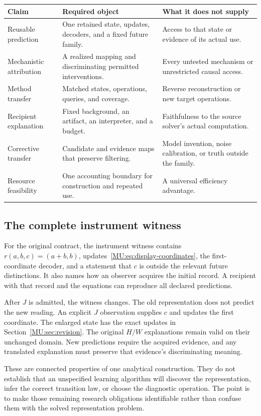 \begin{center}\small
\begin{tabularx}{\textwidth}{@{}P{1.35in}XX@{}}\toprule
Claim & Required object & What it does not supply\\\midrule
Reusable prediction & One retained state, updates, decoders, and a fixed future family. & Access to that state or evidence of its actual use.\\
Mechanistic attribution & A realized mapping and discriminating permitted interventions. & Every untested mechanism or unrestricted causal access.\\
Method transfer & Matched states, operations, queries, and coverage. & Reverse reconstruction or new target operations.\\
Recipient explanation & Fixed background, an artifact, an interpreter, and a budget. & Faithfulness to the source solver's actual computation.\\
Corrective transfer & Candidate and evidence maps that preserve filtering. & Model invention, noise calibration, or truth outside the family.\\
Resource feasibility & One accounting boundary for construction and repeated use. & A universal efficiency advantage.\\\bottomrule
\end{tabularx}\end{center}

\subsection{The complete instrument witness}
For the original contract, the instrument witness contains $r(a,b,c)=(a+b,b)$, updates~\eqref{MU:eq:display-coordinates}, the first-coordinate decoder, and a statement that $c$ is outside the relevant future distinctions. It also names how an observer acquires the initial record. A recipient with that record and the equations can reproduce all declared predictions.

After $J$ is admitted, the witness changes. The old representation does not predict the new reading. An explicit $J$ observation supplies $c$ and updates the first coordinate. The enlarged state has the exact updates in Section~\ref{MU:sec:revision}. The original $H/W$ explanations remain valid on their unchanged domain. New predictions require the acquired evidence, and any translated explanation must preserve that evidence's discriminating meaning.

These are connected properties of one analytical construction. They do not establish that an unspecified learning algorithm will discover the representation, infer the correct transition law, or choose the diagnostic operation. The point is to make those remaining research obligations identifiable rather than confuse them with the solved representation problem.

